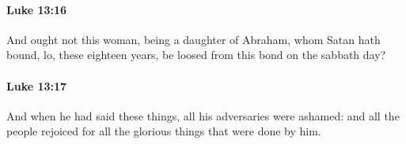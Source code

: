 		\paragraph{Luke 13:16} %
			\label{LUKE-13-16}

			And ought not this woman, being a daughter of Abraham, whom Satan hath bound, lo, these eighteen years, be loosed from this bond on the sabbath day?

			\begin{framed}
			\scriptsize
				\begin{compactdesc}
					\item[SBLG] 
				\end{compactdesc}
			\end{framed}

		\paragraph{Luke 13:17} %
			\label{LUKE-13-17}

			And when he had said these things, all his adversaries were ashamed: and all the people rejoiced for all the glorious things that were done by him.

